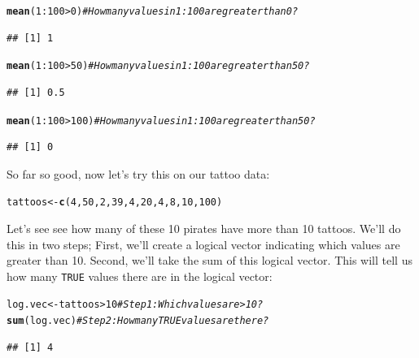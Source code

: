 \documentclass{tufte-book}\usepackage[]{graphicx}\usepackage[]{color}
\makeatletter
\newcommand{\hlnum}[1]{\textcolor[rgb]{0.686,0.059,0.569}{#1}}%
\newcommand{\hlcom}[1]{\textcolor[rgb]{0.678,0.584,0.686}{\textit{#1}}}%
\newcommand{\hlopt}[1]{\textcolor[rgb]{0,0,0}{#1}}%
\newcommand{\hlstd}[1]{\textcolor[rgb]{0.345,0.345,0.345}{#1}}%
\newcommand{\hlkwb}[1]{\textcolor[rgb]{0.69,0.353,0.396}{#1}}%
\newcommand{\hlkwd}[1]{\textcolor[rgb]{0.737,0.353,0.396}{\textbf{#1}}}%
\newenvironment{kframe}{%
 \def\at@end@of@kframe{}%
 \ifinner\ifhmode%
  \def\at@end@of@kframe{\end{minipage}}%
  \begin{minipage}{\columnwidth}%
 \fi\fi%
 \def\FrameCommand##1{\hskip\@totalleftmargin \hskip-\fboxsep
 \colorbox{shadecolor}{##1}\hskip-\fboxsep
     \hskip-\linewidth \hskip-\@totalleftmargin \hskip\columnwidth}%
 \MakeFramed {\advance\hsize-\width
   \@totalleftmargin\z@ \linewidth\hsize
   \@setminipage}}%
 {\par\unskip\endMakeFramed%
 \at@end@of@kframe}
\newenvironment{knitrout}{}{} %
\makeatother
\begin{document}
\begin{footnotesize}
\begin{knitrout}
\color{fgcolor}\begin{kframe}
\begin{alltt}
\hlkwd{mean}\hlstd{(}\hlnum{1}\hlopt{:}\hlnum{100} \hlopt{>} \hlnum{0}\hlstd{)} \hlcom{# How many values in 1:100 are greater than 0?}
\end{alltt}
\begin{verbatim}
## [1] 1
\end{verbatim}
\begin{alltt}
\hlkwd{mean}\hlstd{(}\hlnum{1}\hlopt{:}\hlnum{100} \hlopt{>} \hlnum{50}\hlstd{)} \hlcom{# How many values in 1:100 are greater than 50?}
\end{alltt}
\begin{verbatim}
## [1] 0.5
\end{verbatim}
\begin{alltt}
\hlkwd{mean}\hlstd{(}\hlnum{1}\hlopt{:}\hlnum{100} \hlopt{>} \hlnum{100}\hlstd{)} \hlcom{# How many values in 1:100 are greater than 50?}
\end{alltt}
\begin{verbatim}
## [1] 0
\end{verbatim}
\end{kframe}
\end{knitrout}

So far so good, now let's try this on our tattoo data:

\begin{knitrout}
\color{fgcolor}\begin{kframe}
\begin{alltt}
\hlstd{tattoos} \hlkwb{<-} \hlkwd{c}\hlstd{(}\hlnum{4}\hlstd{,} \hlnum{50}\hlstd{,} \hlnum{2}\hlstd{,} \hlnum{39}\hlstd{,} \hlnum{4}\hlstd{,} \hlnum{20}\hlstd{,} \hlnum{4}\hlstd{,} \hlnum{8}\hlstd{,} \hlnum{10}\hlstd{,} \hlnum{100}\hlstd{)}
\end{alltt}
\end{kframe}
\end{knitrout}

Let's see see how many of these 10 pirates have more than 10 tattoos. We'll do this in two steps; First, we'll create a logical vector indicating which values are greater than 10. Second, we'll take the sum of this logical vector. This will tell us how many \texttt{TRUE} values there are in the logical vector:

\begin{knitrout}
\color{fgcolor}\begin{kframe}
\begin{alltt}
\hlstd{log.vec} \hlkwb{<-} \hlstd{tattoos} \hlopt{>} \hlnum{10} \hlcom{# Step 1: Which values are > 10?}
\hlkwd{sum}\hlstd{(log.vec)} \hlcom{# Step 2: How many TRUE values are there?}
\end{alltt}
\begin{verbatim}
## [1] 4
\end{verbatim}
\end{kframe}
\end{knitrout}


\end{footnotesize}
\end{document}
